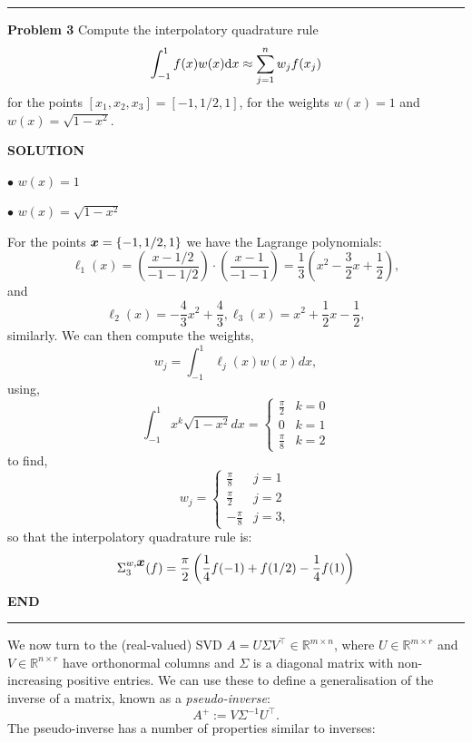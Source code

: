 \documentclass[12pt,a4paper]{article}
\def\bbR{ {\mathbb R} }
\def\x{ {\vc x} }
\begin{document}
\rule{\textwidth}{1pt}
\textbf{Problem 3} Compute the interpolatory quadrature rule
\[
\int_{-1}^1 f(x) w(x) {\rm d} x \approx \sum_{j=1}^n w_j f(x_j)
\]
for the points $[x_1,x_2,x_3] = [-1,1/2,1]$, for the weights $w(x) = 1$ and $w(x) = \sqrt{1-x^2}$.

\textbf{SOLUTION}

\ensuremath{\bullet} $w(x) = 1$

\ensuremath{\bullet} $w(x) = \sqrt{1-x^2}$

For the points $\ensuremath{\bm{\x}} = \{-1, 1/2, 1\}$ we have the Lagrange polynomials:
\[
\ensuremath{\ell}_1(x) = \left(\frac{x - 1/2}{-1 - 1/2}\right)\cdot\left(\frac{x - 1}{-1 - 1}\right) = \frac{1}{3}\left(x^2 - \frac{3}{2}x + \frac{1}{2}\right),
\]
and
\[
\ensuremath{\ell}_2(x) = -\frac{4}{3}x^2 + \frac{4}{3}, \ensuremath{\ell}_3(x) =x^2 + \frac{1}{2}x - \frac{1}{2},
\]
similarly. We can then compute the weights,
\[
w_j = \int_{-1}^1 \ensuremath{\ell}_j(x)w(x)dx,
\]
using,
\[
\int_{-1}^1 x^k \sqrt{1-x^2}dx = \begin{cases}
 \frac{\ensuremath{\pi}}{2} &	k=0 \\
 0 & k=1 \\
\frac{\ensuremath{\pi}}{8} & k=2
 \end{cases}
\]
to find,
\[
w_j = \begin{cases}
 	\frac{\ensuremath{\pi}}{8} & j = 1 \\
 	\frac{\ensuremath{\pi}}{2} & j = 2 \\
 	-\frac{\ensuremath{\pi}}{8} & j = 3,
 \end{cases}
\]
so that the interpolatory quadrature rule is:
\[
\ensuremath{\Sigma}_3^{w,\ensuremath{\bm{\x}}}(f) = \frac{\ensuremath{\pi}}{2}\left(\frac{1}{4}f(-1) + f(1/2) -\frac{1}{4}f(1) \right)
\]
\textbf{END}

\rule{\textwidth}{1pt}
We now turn to the (real-valued) SVD $A = U \ensuremath{\Sigma} V^\ensuremath{\top} \ensuremath{\in} \ensuremath{\bbR}^{m \ensuremath{\times} n}$, where $U \ensuremath{\in} \ensuremath{\bbR}^{m \ensuremath{\times} r}$ and $V \ensuremath{\in} \ensuremath{\bbR}^{n \ensuremath{\times} r}$ have orthonormal columns and $\ensuremath{\Sigma}$ is a diagonal matrix with non-increasing positive entries. We can use these to define a generalisation of the inverse of a matrix, known as a  \emph{pseudo-inverse}:
\[
A^+ := V \ensuremath{\Sigma}^{-1} U^\ensuremath{\top}.
\]
The pseudo-inverse has a number of properties similar to inverses:
\end{document}
